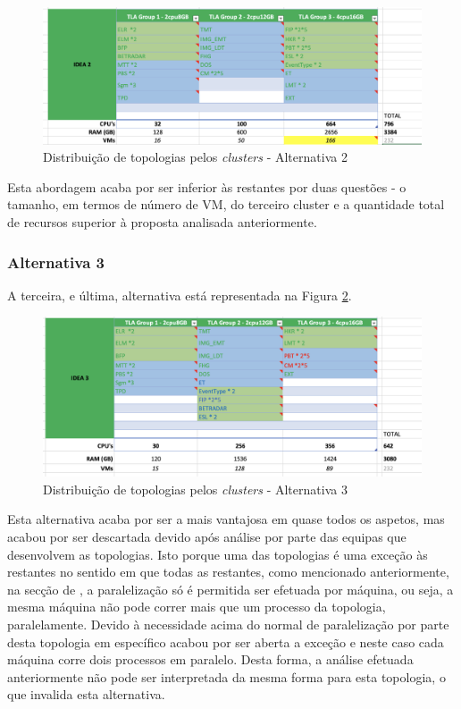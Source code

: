 \begin{figure}[H]
  \centerline{\includegraphics[scale=0.4]{media/content/analise/proposal-2.png}}
  \caption{Distribuição de topologias pelos \textit{clusters} - Alternativa 2}
  \label{proposal-2}
\end{figure}

Esta abordagem acaba por ser inferior às restantes por duas questões - o tamanho, em termos de número 
de \ac{VM}, do terceiro \gls{cluster} e a quantidade total de recursos superior à proposta
analisada anteriormente.

\subsubsection{Alternativa 3}

A terceira, e última, alternativa está representada na Figura \ref{proposal-3}.

\begin{figure}[H]
  \centerline{\includegraphics[scale=0.4]{media/content/analise/proposal-3.png}}
  \caption{Distribuição de topologias pelos \textit{clusters} - Alternativa 3}
  \label{proposal-3}
\end{figure}

Esta alternativa acaba por ser a mais vantajosa em quase todos os aspetos, mas acabou por ser 
descartada devido após análise por parte das equipas que desenvolvem as topologias. Isto porque uma 
das topologias é uma exceção às restantes no sentido em que todas as restantes, como mencionado 
anteriormente, na secção de , a paralelização só é permitida ser 
efetuada por máquina, ou seja, a mesma máquina não pode correr mais que um processo da topologia, 
paralelamente. Devido à necessidade acima do normal de paralelização por parte desta topologia em 
específico acabou por ser aberta a exceção e neste caso cada máquina corre dois processos em 
paralelo. Desta forma, a análise efetuada anteriormente não pode ser interpretada da mesma forma 
para esta topologia, o que invalida esta alternativa.

